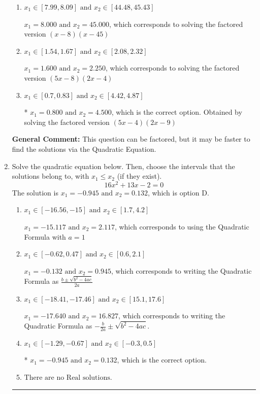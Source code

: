\documentclass{extbook}[14pt]
\newcommand{\litem}[1]{\item #1

\rule{\textwidth}{0.4pt}}
\begin{document}
\begin{enumerate}
{\begin{enumerate}[label=\Alph*.]
$x_1 = 0.267 \text{ and } x_2 = 13.500$, which corresponds to solving the factored version $(5x -1)(2x -27)$
\item \( x_1 \in [7.99, 8.09] \text{ and } x_2 \in [44.48, 45.43] \)

$x_1 = 8.000 \text{ and } x_2 = 45.000$, which corresponds to solving the factored version $(x -8)(x -45)$
\item \( x_1 \in [1.54, 1.67] \text{ and } x_2 \in [2.08, 2.32] \)

$x_1 = 1.600 \text{ and } x_2 = 2.250$, which corresponds to solving the factored version $(5x -8)(2x -4)$
\item \( x_1 \in [0.7, 0.83] \text{ and } x_2 \in [4.42, 4.87] \)

* $x_1 = 0.800 \text{ and } x_2 = 4.500$, which is the correct option. Obtained by solving the factored version $(5x -4)(2x -9)$
\end{enumerate}

\textbf{General Comment:} This question can be factored, but it may be faster to find the solutions via the Quadratic Equation.
}
\litem{
Solve the quadratic equation below. Then, choose the intervals that the solutions belong to, with $x_1 \leq x_2$ (if they exist).
\[ 16x^{2} +13 x -2 = 0 \]
The solution is \( x_1 = -0.945 \text{ and } x_2 = 0.132 \), which is option D.\begin{enumerate}[label=\Alph*.]
\item \( x_1 \in [-16.56, -15] \text{ and } x_2 \in [1.7, 4.2] \)

 $x_1 = -15.117 \text{ and } x_2 = 2.117$, which corresponds to using the Quadratic Formula with $a=1$
\item \( x_1 \in [-0.62, 0.47] \text{ and } x_2 \in [0.6, 2.1] \)

 $x_1 = -0.132 \text{ and } x_2 = 0.945$, which corresponds to writing the Quadratic Formula as $\frac{b \pm \sqrt{b^2 - 4ac}}{2a}$
\item \( x_1 \in [-18.41, -17.46] \text{ and } x_2 \in [15.1, 17.6] \)

 $x_1 = -17.640 \text{ and } x_2 = 16.827$, which corresponds to writing the Quadratic Formula as $-\frac{b}{2a} \pm \sqrt{b^2 - 4ac}$.
\item \( x_1 \in [-1.29, -0.67] \text{ and } x_2 \in [-0.3, 0.5] \)

* $x_1 = -0.945 \text{ and } x_2 = 0.132$, which is the correct option.
\item \( \text{There are no Real solutions.} \)


\end{enumerate}}
\end{enumerate}
\end{document}
